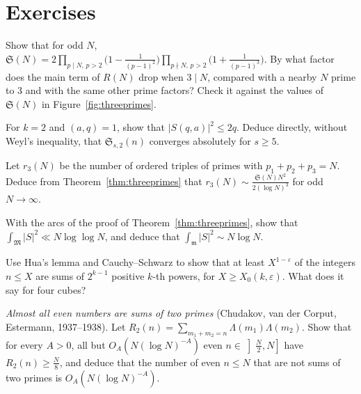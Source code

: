 \section{Exercises}

\begin{exercise}[$\star$]\label{ex:sing3}
Show that for odd $N$, $\mathfrak S(N)=2\prod_{p\mid N,\,p>2}\bigl(1-\frac1{(p-1)^2}\bigr)\prod_{p\nmid N,\,p>2}\bigl(1+\frac1{(p-1)^3}\bigr)$. By what factor does the main term of $R(N)$ drop when $3\mid N$, compared with a nearby $N$ prime to $3$ and with the same other prime factors? Check it against the values of $\mathfrak S(N)$ in Figure~\ref{fig:threeprimes}.
\end{exercise}

\begin{exercise}[$\star$]\label{ex:gausssq}
For $k=2$ and $(a,q)=1$, show that $|S(q,a)|^2\le2q$. Deduce directly, without Weyl's inequality, that $\mathfrak S_{s,2}(n)$ converges absolutely for $s\ge5$.
\end{exercise}

\begin{exercise}[$\star\star$]\label{ex:r3count}
Let $r_3(N)$ be the number of ordered triples of primes with $p_1+p_2+p_3=N$. Deduce from Theorem~\ref{thm:threeprimes} that $r_3(N)\sim\frac{\mathfrak S(N)N^2}{2(\log N)^3}$ for odd $N\to\infty$.
\end{exercise}

\begin{exercise}[$\star\star$]\label{ex:binary}
With the arcs of the proof of Theorem~\ref{thm:threeprimes}, show that $\int_{\mathfrak M}|S|^2\ll N\log\log N$, and deduce that $\int_{\mathfrak m}|S|^2\sim N\log N$.
\end{exercise}

\begin{exercise}[$\star\star$]\label{ex:density}
Use Hua's lemma and Cauchy--Schwarz to show that at least $X^{1-\varepsilon}$ of the integers $n\le X$ are sums of $2^{k-1}$ positive $k$-th powers, for $X\ge X_0(k,\varepsilon)$. What does it say for four cubes?
\end{exercise}

\begin{exercise}[$\star\star\star$]\label{ex:almostall}
\emph{Almost all even numbers are sums of two primes} (Chudakov, van der Corput, Estermann, 1937--1938). Let $R_2(n)=\sum_{m_1+m_2=n}\Lambda(m_1)\Lambda(m_2)$. Show that for every $A>0$, all but $O_A(N(\log N)^{-A})$ even $n\in\left]\frac N2,N\right]$ have $R_2(n)\ge\frac N8$, and deduce that the number of even $n\le N$ that are not sums of two primes is $O_A(N(\log N)^{-A})$.
\end{exercise}

